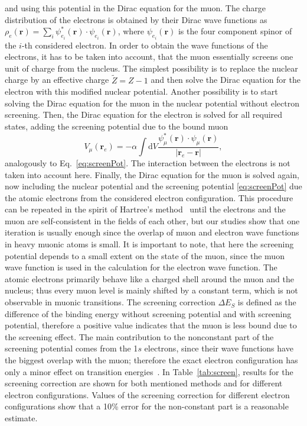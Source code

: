 and using this potential in the Dirac equation for the muon. The charge distribution of the electrons is obtained by their Dirac wave functions as $\rho_e (\mathbf{r})=\sum_i \psi_{e_i}^*(\mathbf{r})\cdot \psi_{e_i}(\mathbf{r})$, where $\psi_{e_i}(\mathbf{r})$  is the four component spinor of the $i$-th considered electron. In order to obtain the wave functions of the electrons, it has to be taken into account, that the muon essentially screens one unit of charge from the nucleus. The simplest possibility is to replace the nuclear charge by an effective charge $\tilde{Z}=Z-1$ and then solve the Dirac equation for the electron with this modified nuclear potential. Another possibility is to start solving the Dirac equation for the muon in the nuclear potential without electron screening. Then, the Dirac equation for the electron is solved for all required states, adding the screening potential due to the bound muon
\begin{equation}
V_{\mu}(\mathbf{r}_e)=-\alpha \int \mathrm{d}V\frac{\psi_\mu^*(\mathbf{r})\cdot \psi_\mu(\mathbf{r})}{|\mathbf{r}_e-\mathbf{r}|},
\end{equation}
analogously to Eq.~\eqref{eq:screenPot}.
The interaction between the electrons is not taken into account here. Finally, the Dirac equation for the muon is solved again, now including the nuclear potential and the screening potential \eqref{eq:screenPot} due the atomic electrons from the considered electron configuration. This procedure can be repeated in the spirit of Hartree's method~\cite{bethe_salpeter} until the electrons and the muon are self-consistent in the fields of each other, but our studies show that one iteration is usually enough since the overlap of muon and electron wave functions in heavy muonic atoms is small. It is important to note, that here the screening potential depends to a small extent on the state of the muon, since the muon wave function is used in the calculation for the electron wave function. The atomic electrons primarily behave like a charged shell around the muon and the nucleus; thus every muon level is mainly shifted by a constant term, which is not observable in muonic transitions. The screening correction $\Delta E_S$ is defined as the difference of the binding energy without screening potential and with screening potential, therefore a positive value indicates that the muon is less bound due to the screening effect. The main contribution to the nonconstant part of the screening potential comes from the 1$s$ electrons, since their wave functions have the biggest overlap with the muon; therefore the exact electron configuration has only a minor effect on transition energies~\cite{vogel1973}. In Table~\ref{tab:screen}, results for the screening correction are shown for both mentioned methods and for different electron configurations. Values of the screening correction for different electron configurations show that a 10\% error for the non-constant part is a reasonable estimate.
%
%
